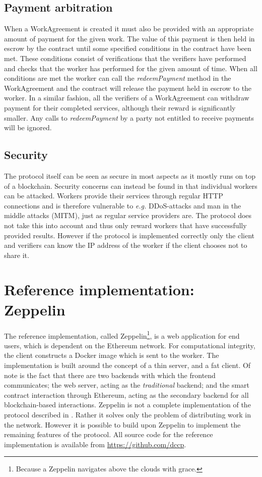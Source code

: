 \subsection{Payment arbitration}
When a WorkAgreement is created it must also be provided with an appropriate amount of payment for the given work. The value of this payment is then held in escrow by the contract until some specified conditions in the contract have been met. These conditions consist of verifications that the verifiers have performed and checks that the worker has performed for the given amount of time. When all conditions are met the worker can call the \textit{redeemPayment} method in the WorkAgreement and the contract will release the payment held in escrow to the worker. In a similar fashion, all the verifiers of a WorkAgreement can withdraw payment for their completed services, although their reward is significantly smaller. Any calls to \textit{redeemPayment} by a party not entitled to receive payments will be ignored.

\subsection{Security}
The protocol itself can be seen as secure in most aspects as it mostly runs on top of a blockchain. Security concerns can instead be found in that individual workers can be attacked. Workers provide their services through regular HTTP connections and is therefore vulnerable to \textit{e.g.} DDoS-attacks and man in the middle attacks (MITM), just as regular service providers are. The protocol does not take this into account and thus only reward workers that have successfully provided results. However if the protocol is implemented correctly only the client and verifiers can know the IP address of the worker if the client chooses not to share it.

\section{Reference implementation: Zeppelin}
The reference implementation, called Zeppelin\footnote{Because a Zeppelin navigates above the clouds with grace.}, is a web application for end users, which is dependent on the Ethereum network. For computational integrity, the client constructs a Docker image which is sent to the worker. The implementation is built around the concept of a thin server, and a fat client. Of note is the fact that there are two backends with which the frontend communicates; the web server, acting as the \textit{traditional} backend; and the smart contract interaction through Ethereum, acting as the secondary backend for all blockchain-based interactions. Zeppelin is not a complete implementation of the protocol described in . Rather it solves only the problem of distributing work in the network. However it is possible to build upon Zeppelin to implement the remaining features of the protocol.
All source code for the reference implementation is available from \href{https://github.com/dccp}{https://github.com/dccp}.

